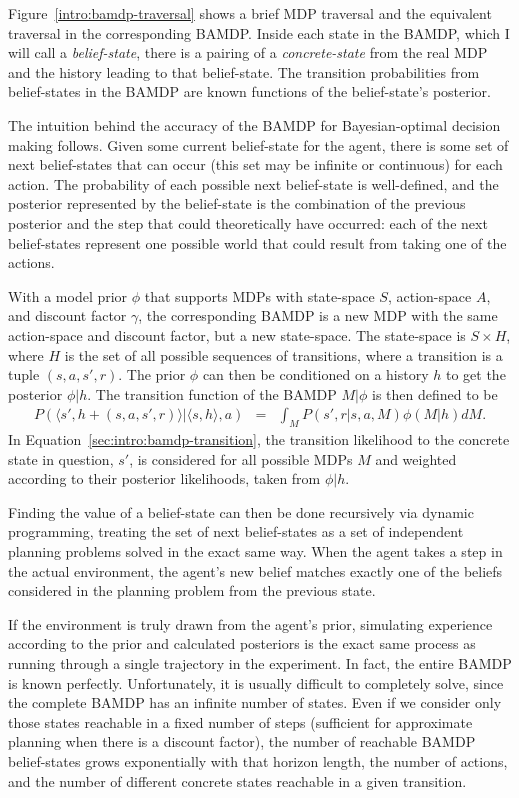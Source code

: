 Figure~\ref{intro:bamdp-traversal} shows a brief MDP traversal and the equivalent traversal in the corresponding BAMDP. Inside each state in the BAMDP, which I will call a \emph{belief-state}, there is a pairing of a \emph{concrete-state} from the real MDP and the history leading to that belief-state. The transition probabilities from belief-states in the BAMDP are known functions of the belief-state's posterior.

The intuition behind the accuracy of the BAMDP for Bayesian-optimal decision making follows. Given some current belief-state for the agent, there is some set of next belief-states that can occur (this set may be infinite or continuous) for each action. The probability of each possible next belief-state is well-defined, and the posterior represented by the belief-state is the combination of the previous posterior and the step that could theoretically have occurred: each of the next belief-states represent one possible world that could result from taking one of the actions.

With a model prior $\phi$ that supports MDPs with state-space $S$, action-space $A$, and discount factor $\gamma$, the corresponding BAMDP is a new MDP with the same action-space and discount factor, but a new state-space. The state-space is $S\times H$, where $H$ is the set of all possible sequences of transitions, where a transition is a tuple $(s, a, s', r)$. The prior $\phi$ can then be conditioned on a history $h$ to get the posterior $\phi|h$. The transition function of the BAMDP $M|\phi$ is then defined to be
\begin{eqnarray}
P(\langle s', h+(s,a,s',r)\rangle|\langle s, h\rangle, a) &=& \int_M P(s', r|s,a,M) \phi(M|h) dM. \label{sec:intro:bamdp-transition}
\end{eqnarray}
In Equation~\ref{sec:intro:bamdp-transition}, the transition likelihood to the concrete state in question, $s'$, is considered for all possible MDPs $M$ and weighted according to their posterior likelihoods, taken from $\phi|h$.

Finding the value of a belief-state can then be done recursively via dynamic programming, treating the set of next belief-states as a set of independent planning problems solved in the exact same way. When the agent takes a step in the actual environment, the agent's new belief matches exactly one of the beliefs considered in the planning problem from the previous state.

If the environment is truly drawn from the agent's prior, simulating experience according to the prior and calculated posteriors is the exact same process as running through a single trajectory in the experiment. In fact, the entire BAMDP is known perfectly. Unfortunately, it is usually difficult to completely solve, since the complete BAMDP has an infinite number of states. Even if we consider only those states reachable in a fixed number of steps (sufficient for approximate planning when there is a discount factor), the number of reachable BAMDP belief-states grows exponentially with that horizon length, the number of actions, and the number of different concrete states reachable in a given transition.


